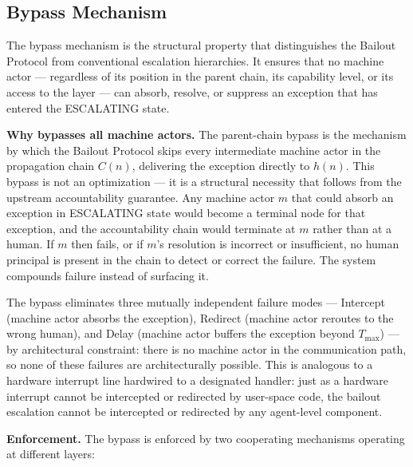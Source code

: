 \subsection{Bypass Mechanism}\label{sec:bypass-mechanism}

The bypass mechanism is the structural property that distinguishes the Bailout Protocol from conventional escalation hierarchies. It ensures that no machine actor — regardless of its position in the parent chain, its capability level, or its access to the \fact{} layer — can absorb, resolve, or suppress an exception that has entered the ESCALATING state.

\bigskip
\noindent\textbf{Why bypasses all machine actors.} The parent-chain bypass is the mechanism by which the Bailout Protocol skips every intermediate machine actor in the propagation chain $C(n)$, delivering the exception directly to $h(n)$. This bypass is not an optimization — it is a structural necessity that follows from the upstream accountability guarantee. Any machine actor $m$ that could absorb an exception in ESCALATING state would become a terminal node for that exception, and the accountability chain would terminate at $m$ rather than at a human. If $m$ then fails, or if $m$'s resolution is incorrect or insufficient, no human principal is present in the chain to detect or correct the failure. The system compounds failure instead of surfacing it.

The bypass eliminates three mutually independent failure modes — Intercept (machine actor absorbs the exception), Redirect (machine actor reroutes to the wrong human), and Delay (machine actor buffers the exception beyond $T_{\max}$) — by architectural constraint: there is no machine actor in the communication path, so none of these failures are architecturally possible. This is analogous to a hardware interrupt line hardwired to a designated handler: just as a hardware interrupt cannot be intercepted or redirected by user-space code, the bailout escalation cannot be intercepted or redirected by any agent-level component.

\bigskip
\noindent\textbf{Enforcement.} The bypass is enforced by two cooperating mechanisms operating at different layers:

